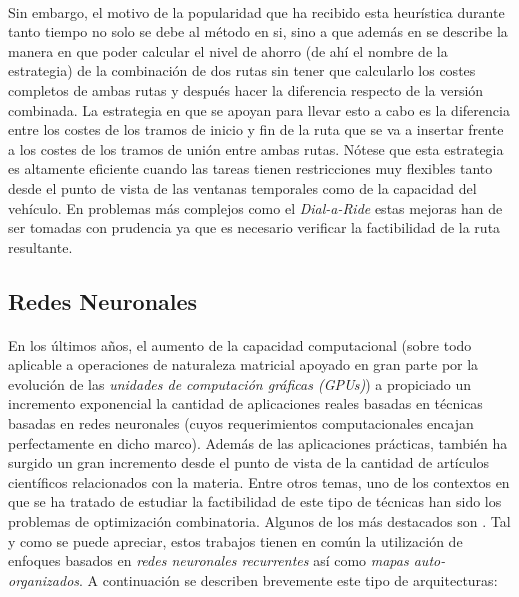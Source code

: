 \documentclass{subfiles}
\begin{document}
        \paragraph{}
        Sin embargo, el motivo de la popularidad que ha recibido esta heurística durante tanto tiempo no solo se debe al método en si, sino a que además en \cite{clarke1964scheduling} se describe la manera en que poder calcular el nivel de ahorro (de ahí el nombre de la estrategia) de la combinación de dos rutas sin tener que calcularlo los costes completos de ambas rutas y después hacer la diferencia respecto de la versión combinada. La estrategia en que se apoyan para llevar esto a cabo es la diferencia entre los costes de los tramos de inicio y fin de la ruta que se va a insertar frente a los costes de los tramos de unión entre ambas rutas. Nótese que esta estrategia es altamente eficiente cuando las tareas tienen restricciones muy flexibles tanto desde el punto de vista de las ventanas temporales como de la capacidad del vehículo. En problemas más complejos como el \emph{Dial-a-Ride} estas mejoras han de ser tomadas con prudencia ya que es necesario verificar la factibilidad de la ruta resultante.

      \subsection{Redes Neuronales}
      \label{sec:solving_neural_networks}

        \paragraph{}
        En los últimos años, el aumento de la capacidad computacional (sobre todo aplicable a operaciones de naturaleza matricial apoyado en gran parte por la evolución de las \emph{unidades de computación gráficas (GPUs)}) a propiciado un incremento exponencial la cantidad de aplicaciones reales basadas en técnicas basadas en redes neuronales (cuyos requerimientos computacionales encajan perfectamente en dicho marco). Además de las aplicaciones prácticas, también ha surgido un gran incremento desde el punto de vista de la cantidad de artículos científicos relacionados con la materia. Entre otros temas, uno de los contextos en que se ha tratado de estudiar la factibilidad de este tipo de técnicas han sido los problemas de optimización combinatoria. Algunos de los más destacados son \cite{potvin1993state,ghaziri2003neural,leung2004expanding,masutti2009self,bello2016neural}. Tal y como se puede apreciar, estos trabajos tienen en común la utilización de enfoques basados en \emph{redes neuronales recurrentes} así como \emph{mapas auto-organizados}. A continuación se describen brevemente este tipo de arquitecturas:
\end{document}
